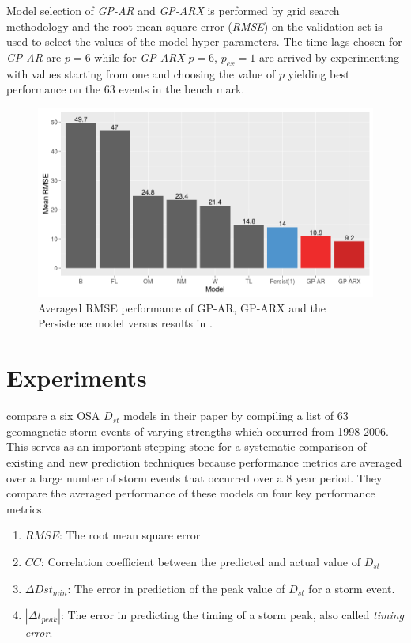 \documentclass[referee,a4paper,12pt,traditabstract]{swsc}
\begin{document}
\begin{linenumbers}
Model selection of \emph{GP-AR} and \emph{GP-ARX} is performed by grid search methodology and the root mean square error (\emph{RMSE}) on the validation set is used to select the values of the model hyper-parameters. The time lags chosen for \emph{GP-AR} are $p = 6$ while for \emph{GP-ARX} $p=6$, $p_{ex} = 1$ are arrived by experimenting with values starting from one and choosing the value of $p$ yielding best performance on the 63 events in the bench mark.   

\begin{figure}
   \centering
   \includegraphics[width=\textwidth]{Compare_RMSE.png}
      \caption{Averaged RMSE performance of GP-AR, GP-ARX and the Persistence model versus results in \citet{Ji2012}.}
         \label{fig:rmse}
   \end{figure}

\section{Experiments} \label{sec:exp}

\citet{Ji2012} compare a six OSA $D_{st}$ models in their paper by compiling a list of 63 geomagnetic storm events of varying strengths which occurred from 1998-2006. This serves as an important stepping stone for a systematic comparison of existing and new prediction techniques because performance metrics are averaged over a large number of storm events that occurred over a 8 year period. They compare the averaged performance of these models on four key performance metrics.

\begin{enumerate}
    \item $RMSE$: The root mean square error
    \item $CC$: Correlation coefficient between the predicted and actual value of $D_{st}$
    \item $\Delta Dst_{min}$: The error in prediction of the peak value of $D_{st}$ for a storm event.
    \item $|\Delta t_{peak}|$: The error in predicting the timing of a storm peak, also called \emph{timing error}. 
\end{enumerate}



\end{linenumbers}
\end{document}
